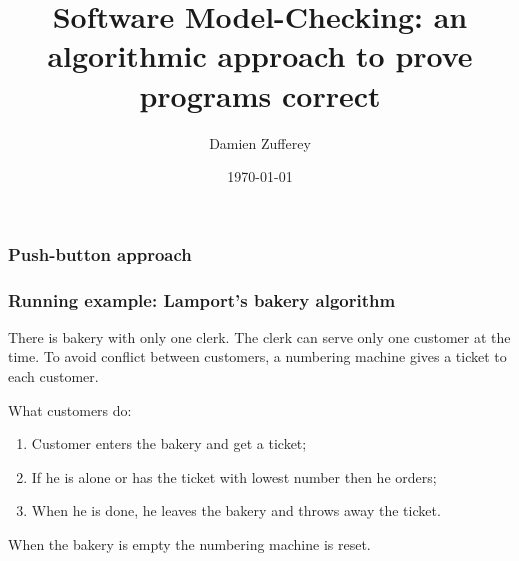 \documentclass{beamer}
\title[Software Model-Checking]{Software Model-Checking: an algorithmic approach to prove programs correct}
\author{ Damien Zufferey }
\institute{ IST Austria }
\date{\today}
\begin{document}
\frame[plain]{\titlepage}

\begin{frame}
  \frametitle{Push-button approach}
\begin{figure}
\end{figure}
\end{frame}

\begin{frame}
  \frametitle{Running example: Lamport's bakery algorithm}

  There is bakery with only one clerk.
  The clerk can serve only one customer at the time.
  To avoid conflict between customers, a numbering machine gives a ticket to each customer.

  \vspace{10pt}

  What customers do:
  {\small
  \begin{enumerate}
    \item Customer enters the bakery and get a ticket;
    \item If he is alone or has the ticket with lowest number then he orders;
    \item When he is done, he leaves the bakery and throws away the ticket.
  \end{enumerate}
  }

  \vspace{10pt}

  When the bakery is empty the numbering machine is reset.

\end{frame}
\end{document}
